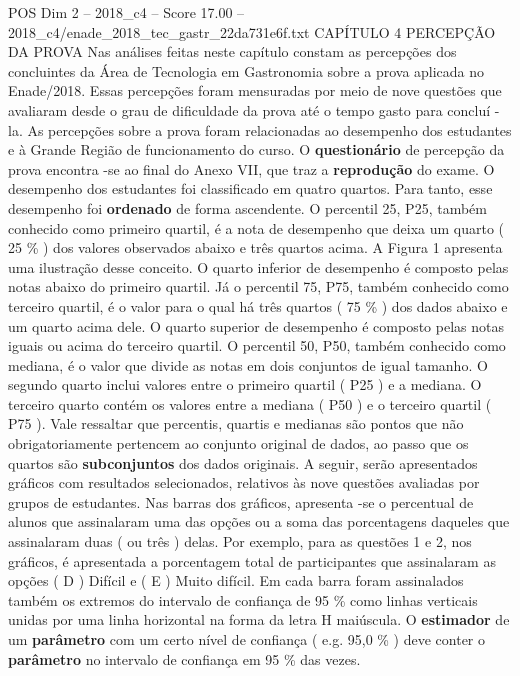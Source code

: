 \begin{textsample}{POS Dim 2 – 2018\_c4 – Score 17.00 – 2018\_c4/enade\_2018\_tec\_gastr\_22da731e6f.txt}  \label{ex:f2_pos_051}
CAPÍTULO 4 PERCEPÇÃO DA PROVA Nas análises feitas neste capítulo constam as percepções dos concluintes da Área de Tecnologia em Gastronomia sobre a prova aplicada no Enade/2018.
Essas percepções foram mensuradas por meio de nove questões que avaliaram desde o grau de dificuldade da prova até o tempo gasto para concluí -la.
As percepções sobre a prova foram relacionadas ao desempenho dos estudantes e à Grande Região de funcionamento do curso.
O \textbf{questionário} de percepção da prova encontra -se ao final do Anexo VII, que traz a \textbf{reprodução} do exame.
O desempenho dos estudantes foi classificado em quatro quartos.
Para tanto, esse desempenho foi \textbf{ordenado} de forma ascendente.
O percentil 25, P25, também conhecido como primeiro quartil, é a nota de desempenho que deixa um quarto ( 25 \% ) dos valores observados abaixo e três quartos acima.
A Figura 1 apresenta uma ilustração desse conceito.
O quarto inferior de desempenho é composto pelas notas abaixo do primeiro quartil.
Já o percentil 75, P75, também conhecido como terceiro quartil, é o valor para o qual há três quartos ( 75 \% ) dos dados abaixo e um quarto acima dele.
O quarto superior de desempenho é composto pelas notas iguais ou acima do terceiro quartil.
O percentil 50, P50, também conhecido como mediana, é o valor que divide as notas em dois conjuntos de igual tamanho.
O segundo quarto inclui valores entre o primeiro quartil ( P25 ) e a mediana.
O terceiro quarto contém os valores entre a mediana ( P50 ) e o terceiro quartil ( P75 ).
Vale ressaltar que percentis, quartis e medianas são pontos que não obrigatoriamente pertencem ao conjunto original de dados, ao passo que os quartos são \textbf{subconjuntos} dos dados originais.
A seguir, serão apresentados gráficos com resultados selecionados, relativos às nove questões avaliadas por grupos de estudantes.
Nas barras dos gráficos, apresenta -se o percentual de alunos que assinalaram uma das opções ou a soma das porcentagens daqueles que assinalaram duas ( ou três ) delas.
Por exemplo, para as questões 1 e 2, nos gráficos, é apresentada a porcentagem total de participantes que assinalaram as opções ( D ) Difícil e ( E ) Muito difícil.
Em cada barra foram assinalados também os extremos do intervalo de confiança de 95 \% como linhas verticais unidas por uma linha horizontal na forma da letra H maiúscula.
O \textbf{estimador} de um \textbf{parâmetro} com um certo nível de confiança ( e.g. 95,0 \% ) deve conter o \textbf{parâmetro} no intervalo de confiança em 95 \% das vezes.

\end{textsample}
